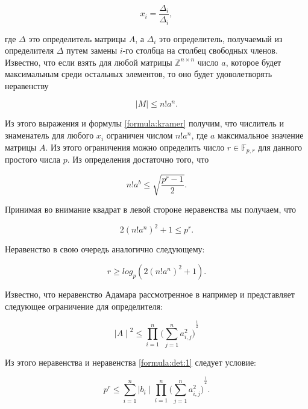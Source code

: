 \documentclass[master, och, diploma, times]{sty/SCWorks}
\theoremstyle{plain}
\theoremstyle{definition}
\begin{document}
\begin{equation}\label{formula:kramer}
x_i=\frac{\Delta_i}{\Delta_i},	
\end{equation}

\noindent где $\Delta$ это определитель матрицы $A$, а $\Delta_i$ это определитель, получаемый из определителя $\Delta$ путем замены $i$-го столбца на столбец свободных членов. Известно, что если взять для любой матрицы $\mathbb{Z}^{n \times n}$ число $a$, которое будет максимальным среди остальных элементов, то оно будет удоволетворять неравенству

\begin{equation}
\mid M \mid \leq n!a^n.
\end{equation}

\noindent Из этого выражения и формулы \ref{formula:kramer} получим, что числитель и знаменатель для любого $x_i$ ограничен числом $n!a^n$, где $a$ максимальное значение матрицы $A$. Из этого ограничения можно определить число $r \in \mathbb{F}_{p,r}$ для данного простого числа $p$. Из определения достаточно того, что

\begin{equation}\label{formula:det:1}
n!a^b \leq \sqrt{\frac{p^r-1}{2}}.
\end{equation}

Принимая во внимание квадрат в левой стороне неравенства мы получаем, что 

\begin{equation}
2{(n!a^n)}^2+1\leq p^r.
\end{equation}

Неравенство в свою очередь аналогично следующему:

\begin{equation} \label{eq:matrix:r}
r \geq log_p(2{(n!a^n)}^2+1).
\end{equation}

Известно, что неравенство Адамара рассмотренное в например \cite{bib:numbers:mignotte} и \cite{bib:numbers:marcus} представляет следующее ограничение для определителя:

\begin{equation}
{\mid A \mid}^2 \leq \prod\limits_{i=1}^{n}{\bigg(\sum\limits_{j=1}^{n} a^2_{i,j} \bigg)}^{\frac{1}{2}}
\end{equation}

Из этого неравенства и неравенства \ref{formula:det:1} следует условие:

\begin{equation}
p^r \leq \sum\limits_{i=1}^{n} {\mid b_i \mid} \prod\limits_{i=1}^{n}{\bigg(\sum\limits_{j=1}^{n} a^2_{i,j} \bigg)}^{\frac{1}{2}}.
\end{equation}
\end{document}
